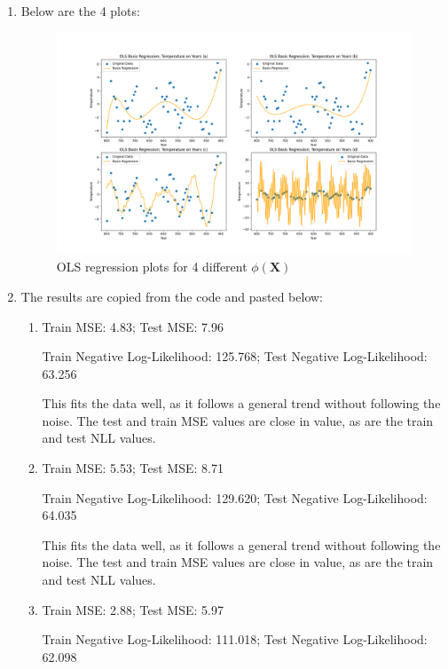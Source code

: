 \documentclass[submit]{harvardml}
\begin{document}
\begin{enumerate}
\item
    Below are the 4 plots:
    \begin{figure}[h]
        \centering
        \includegraphics[scale=0.47]{hw1/images/p3.1.png}
        \caption{OLS regression plots for 4 different $\phi(\textbf{X})$}
        \label{fig:my_label}
    \end{figure}

\item
    The results are copied from the code and pasted below:\\

    \begin{enumerate}[a]
    \item 
    Train MSE: 4.83; Test MSE: 7.96
    
    Train Negative Log-Likelihood: 125.768; Test Negative Log-Likelihood: 63.256

    This fits the data well, as it follows a general trend without following the noise. The test and train MSE values are close in value, as are the train and test NLL values.
    
    \item
    Train MSE: 5.53; Test MSE: 8.71
    
    Train Negative Log-Likelihood: 129.620; Test Negative Log-Likelihood: 64.035
    
    This fits the data well, as it follows a general trend without following the noise. The test and train MSE values are close in value, as are the train and test NLL values.
    
    \item
    Train MSE: 2.88; Test MSE: 5.97
    
    Train Negative Log-Likelihood: 111.018; Test Negative Log-Likelihood: 62.098


\end{enumerate}
\end{enumerate}
\end{document}
